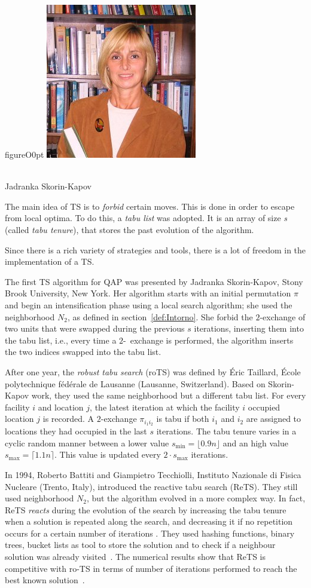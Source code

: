 \begin{wrapfloat}{figure}{O}{0pt}
	\includegraphics[width=.15\textwidth]{Jadranka_Skorin_Kapov}
	\caption[Skorin-Kapov]{\\Jadranka Skorin-Kapov}
\end{wrapfloat}


The main idea of TS is to \textit{forbid} certain moves. This is done in order to escape from local optima. To do this, a \textit{tabu list} was adopted. It is an array of size \textit{s} (called \textit{tabu tenure}), that stores the past evolution of the algorithm.

Since there is a rich variety of strategies and tools, there is a lot of freedom in the implementation of a TS.







The first TS algorithm for QAP was presented by  Jadranka Skorin-Kapov, Stony Brook University, New York. Her algorithm starts with an initial permutation $\pi$ and begin an intensification phase using a local search algorithm; she used the neighborhood ${N}_2$, as defined in section~\ref{def:Intorno}. She forbid the $2$-exchange of two units that were swapped during the previous $s$ iterations, inserting them into the tabu list, i.e., every time a $2$-~exchange is performed, the algorithm inserts the two indices swapped into the tabu list. 


After one year, the \textit{robust tabu search} (roTS) was defined by Éric Taillard, École polytechnique fédérale de Lausanne (Lausanne, Switzerland). Based on Skorin-Kapov work, they used the same neighborhood but a different  tabu list. For every facility $i$ and location $j$, the latest iteration at which the facility $i$ occupied location $j$ is recorded. A $2$-exchange $\pi_{i_1i_2}$ is tabu if  both $i_1$ and $i_2$ are assigned to locations they had occupied in the last $s$ iterations. The tabu tenure varies in a cyclic random manner between a lower value $s_\mathrm{min}=\lfloor 0.9 n \rfloor$ and an high value $s_\mathrm{max}=\lceil 1.1n \rceil$. This value is updated every $2 \cdot s_\mathrm{max}$ iterations.

In 1994, Roberto Battiti and Giampietro  Tecchiolli, Instituto Nazionale di Fisica Nucleare (Trento, Italy),  introduced the reactive tabu search (ReTS). They still used neighborhood $N_2$, but the algorithm evolved in a more complex way. In fact, ReTS \textit{reacts} during the evolution of the search by increasing the tabu tenure when a solution is repeated along the search, and decreasing it if no repetition occurs for a certain number of iterations . They used hashing functions, binary trees, bucket lists as tool to store the solution and to check if a neighbour solution was already visited~\cite{Burkard2012}. The numerical results show that ReTS is competitive with ro-TS in terms of number of iterations performed to reach the best known solution~\cite{Burkard2012}.




